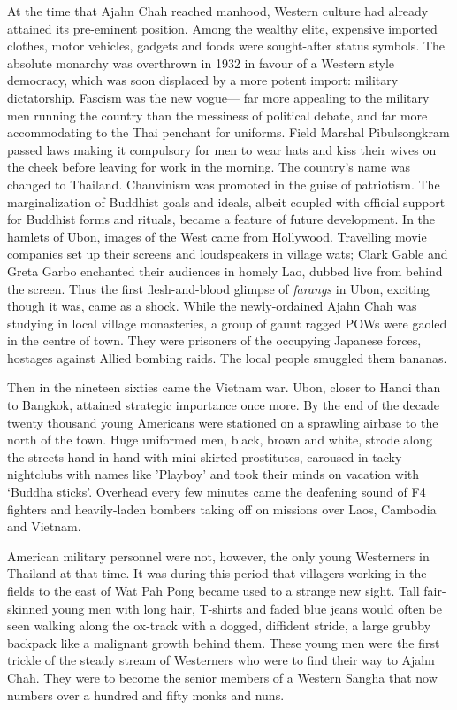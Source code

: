 At the time that Ajahn Chah reached manhood, Western culture had already
attained its pre-eminent position. Among the wealthy elite, expensive
imported clothes, motor vehicles, gadgets and foods were sought-after
status symbols. The absolute monarchy was overthrown in 1932 in favour
of a Western style democracy, which was soon displaced by a more potent
import: military dictatorship. Fascism was the new vogue--- far more
appealing to the military men running the country than the messiness of
political debate, and far more accommodating to the Thai penchant for
uniforms. Field Marshal Pibulsongkram passed laws making it compulsory
for men to wear hats and kiss their wives on the cheek before leaving
for work in the morning. The country's name was changed to Thailand.
Chauvinism was promoted in the guise of patriotism. The marginalization
of Buddhist goals and ideals, albeit coupled with official support for
Buddhist forms and rituals, became a feature of future development. In
the hamlets of Ubon, images of the West came from Hollywood. Travelling
movie companies set up their screens and loudspeakers in village wats;
Clark Gable and Greta Garbo enchanted their audiences in homely Lao,
dubbed live from behind the screen. Thus the first flesh-and-blood
glimpse of \emph{farangs} in Ubon, exciting though it was, came as a
shock. While the newly-ordained Ajahn Chah was studying in local village
monasteries, a group of gaunt ragged POWs were gaoled in the centre of
town. They were prisoners of the occupying Japanese forces, hostages
against Allied bombing raids. The local people smuggled them bananas.

Then in the nineteen sixties came the Vietnam war. Ubon, closer to Hanoi
than to Bangkok, attained strategic importance once more. By the end of
the decade twenty thousand young Americans were stationed on a sprawling
airbase to the north of the town. Huge uniformed men, black, brown and
white, strode along the streets hand-in-hand with mini-skirted
prostitutes, caroused in tacky nightclubs with names like 'Playboy' and
took their minds on vacation with `Buddha sticks'. Overhead every few
minutes came the deafening sound of F4 fighters and heavily-laden
bombers taking off on missions over Laos, Cambodia and Vietnam.

American military personnel were not, however, the only young Westerners
in Thailand at that time. It was during this period that villagers
working in the fields to the east of Wat Pah Pong became used to a
strange new sight. Tall fair-skinned young men with long hair, T-shirts
and faded blue jeans would often be seen walking along the ox-track with
a dogged, diffident stride, a large grubby backpack like a malignant
growth behind them. These young men were the first trickle of the steady
stream of Westerners who were to find their way to Ajahn Chah. They were
to become the senior members of a Western Sangha that now numbers over a
hundred and fifty monks and nuns.

